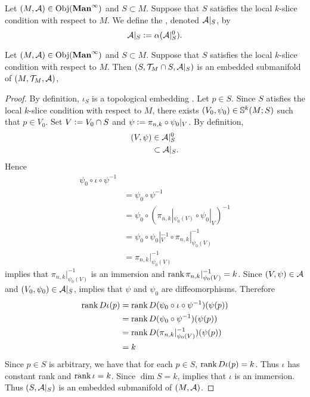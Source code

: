 \documentclass{book}
\begin{document}
	\begin{defn}
			Let $(M, \MA) \in \Obj(\Maninf)$ and $S \subset M$. Suppose that $S$ satisfies the local $k$-slice condition with respect to $M$. We define the , denoted $\MA|_S$, by 
			$$\MA|_S \defeq \al(\MA|_S^0).$$
	\end{defn}
	
	\begin{ex}
		Let $(M, \MA) \in \Obj(\Maninf)$ and $S \subset M$. Suppose that $S$ satisfies the local $k$-slice condition with respect to $M$. Then $(S, \MT_M \cap S, \MA|_S)$ is an embedded submanifold of $(M, \MT_M, \MA)$,
	\end{ex}

	\begin{proof} 
		By definition, $\iota_S$ is a topological embedding . Let $p \in S$. Since $S$ atisfies the local $k$-slice condition with respect to $M$, there exists $(V_0, \psi_0) \in \S^k(M; S)$ such that $p \in V_0$. Set $V \defeq V_0 \cap S$ and $\psi \defeq \pi_{n,k} \circ \psi_0|_V$. By definition,  
		\begin{align*}
			(V, \psi) 
			& \in \MA|_S^0 \\
			& \subset \MA|_S.
		\end{align*}
		Hence 
		\begin{align*}
			\psi_0 \circ \iota \circ \psi^{-1} \\
			& = \psi_0 \circ \psi^{-1} \\
			& = \psi_0 \circ (\pi_{n,k}|_{\psi_0(V)} \circ \psi_0|_V)^{-1} \\
			& = \psi_0 \circ \psi_0|_V^{-1} \circ \pi_{n,k}|_{\psi_0(V)}^{-1} \\
			& = \pi_{n,k}|_{\psi_0(V)}^{-1} 
		\end{align*}
		 implies that $\pi_{n,k}|_{\psi_0(V)}^{-1}$ is an immersion and $\rnk \pi_{n,k}|_{\psi_0(V)}^{-1} = k$. Since $(V, \psi) \in \MA$ and $(V_0, \psi_0) \in \MA|_S$,  implies that $\psi$ and $\psi_0$ are diffeomorphisms. Therefore
		\begin{align*}
			\rnk D \iota (p)
			& = \rnk D (\psi_0 \circ \iota \circ \psi^{-1})(\psi(p)) \\
			& = \rnk D (\psi_0 \circ \psi^{-1})(\psi(p)) \\
			& = \rnk D (\pi_{n,k}|_{\psi_0(V)}^{-1})(\psi(p)) \\
			& = k
		\end{align*}  
		Since $p \in S$ is arbitrary, we have that for each $p \in S$, $\rnk D \iota (p) = k$. Thus $\iota$ has constant rank and $\rnk \iota = k$. Since $\dim S = k$,  implies that $\iota$ is an immersion. Thus $(S, \MA|_S)$ is an embedded submanifold of $(M, \MA)$.
	\end{proof}
	
\end{document}
